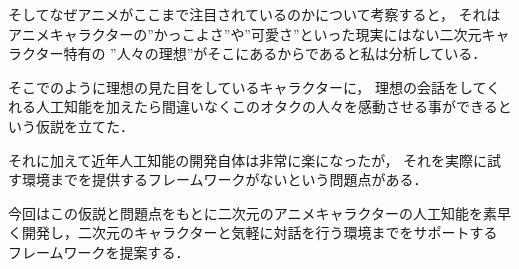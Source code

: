 そしてなぜアニメがここまで注目されているのかについて考察すると，
それはアニメキャラクターの”かっこよさ”や”可愛さ”といった現実にはない二次元キャラクター特有の
”人々の理想”がそこにあるからであると私は分析している．


そこでのように理想の見た目をしているキャラクターに，
理想の会話をしてくれる人工知能を加えたら間違いなくこのオタクの人々を感動させる事ができるという仮説を立てた．

それに加えて近年人工知能の開発自体は非常に楽になったが，
それを実際に試す環境までを提供するフレームワークがないという問題点がある．

今回はこの仮説と問題点をもとに二次元のアニメキャラクターの人工知能を素早く開発し，二次元のキャラクターと気軽に対話を行う環境までをサポートする
フレームワークを提案する．

